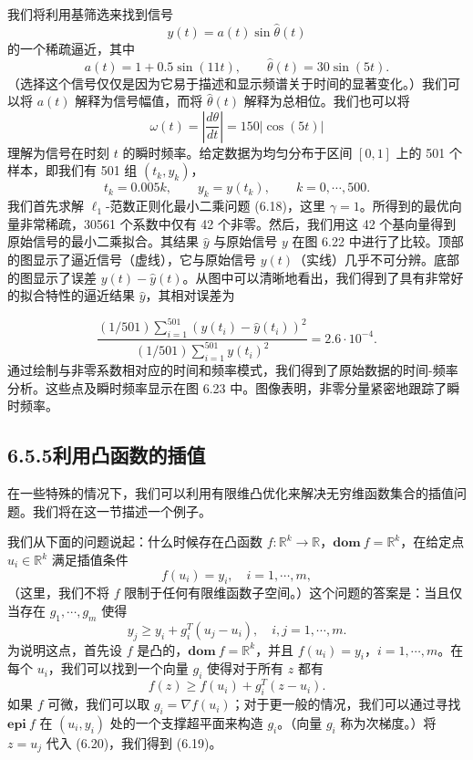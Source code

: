 \documentclass[UTF8, 12pt, fontset=fandol, oneside]{ctexart}
\begin{document}
我们将利用基筛选来找到信号
\[
y(t)=a(t)\sin\hat{\theta}(t)
\]
的一个稀疏逼近，其中
\[
a(t)=1+0.5\sin(11t),\qquad \hat{\theta}(t)=30\sin(5t).
\]
（选择这个信号仅仅是因为它易于描述和显示频谱关于时间的显著变化。）我们可以将 $a(t)$ 解释为信号幅值，而将 $\hat{\theta}(t)$ 解释为总相位。我们也可以将
\[
\omega(t)=\left|\frac{d\theta}{dt}\right|=150|\cos(5t)|
\]
理解为信号在时刻 $t$ 的瞬时频率。给定数据为均匀分布于区间 $[0,1]$ 上的 501 个样本，即我们有 501 组 $(t_k,y_k)$，
\[
t_k=0.005k,\qquad y_k=y(t_k),\qquad k=0,\cdots,500.
\]
我们首先求解 $\ell_1$-范数正则化最小二乘问题 (6.18)，这里 $\gamma=1$。所得到的最优向量非常稀疏，30561 个系数中仅有 42 个非零。然后，我们用这 42 个基向量得到原始信号的最小二乘拟合。其结果 $\hat{y}$ 与原始信号 $y$ 在图 6.22 中进行了比较。顶部的图显示了逼近信号（虚线），它与原始信号 $y(t)$（实线）几乎不可分辨。底部的图显示了误差 $y(t)-\hat{y}(t)$。从图中可以清晰地看出，我们得到了具有非常好的拟合特性的逼近结果 $\hat{y}$，其相对误差为

\[
\frac{(1/501)\sum_{i=1}^{501}(y(t_i)-\hat{y}(t_i))^2}{(1/501)\sum_{i=1}^{501}y(t_i)^2}=2.6\cdot 10^{-4}.
\]
通过绘制与非零系数相对应的时间和频率模式，我们得到了原始数据的时间-频率分析。这些点及瞬时频率显示在图 6.23 中。图像表明，非零分量紧密地跟踪了瞬时频率。

\subsection*{6.5.5\quad 利用凸函数的插值}

在一些特殊的情况下，我们可以利用有限维凸优化来解决无穷维函数集合的插值问题。我们将在这一节描述一个例子。

我们从下面的问题说起：什么时候存在凸函数 $f:\mathbb{R}^k\to\mathbb{R}$，$\mathbf{dom}\ f=\mathbb{R}^k$，在给定点 $u_i\in\mathbb{R}^k$ 满足插值条件
\[
f(u_i)=y_i,\quad i=1,\cdots,m,
\]
（这里，我们不将 $f$ 限制于任何有限维函数子空间。）这个问题的答案是：当且仅当存在 $g_1,\cdots,g_m$ 使得
\begin{equation}
y_j\geq y_i+g_i^T(u_j-u_i),\quad i,j=1,\cdots,m.
\tag{6.19}
\end{equation}
为说明这点，首先设 $f$ 是凸的，$\mathbf{dom}\ f=\mathbb{R}^k$，并且 $f(u_i)=y_i$，$i=1,\cdots,m$。在每个 $u_i$，我们可以找到一个向量 $g_i$ 使得对于所有 $z$ 都有
\begin{equation}
f(z)\geq f(u_i)+g_i^T(z-u_i).
\tag{6.20}
\end{equation}
如果 $f$ 可微，我们可以取 $g_i=\nabla f(u_i)$；对于更一般的情况，我们可以通过寻找 $\mathbf{epi}\ f$ 在 $(u_i,y_i)$ 处的一个支撑超平面来构造 $g_i$。（向量 $g_i$ 称为次梯度。）将 $z=u_j$ 代入 (6.20)，我们得到 (6.19)。
\end{document}
